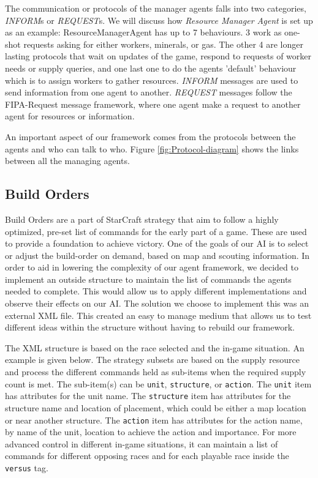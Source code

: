 \documentclass[letterpaper]{article}
\begin{document}
The communication or protocols of the manager agents falls into two categories, \emph{INFORM}s or \emph{REQUEST}s. 
We will discuss how \emph{Resource Manager Agent} is set up as an example:
ResourceManagerAgent has up to 7 behaviours. 3 work as one-shot requests asking for either workers, minerals, or 
gas. The other 4 are longer lasting protocols that wait on updates of the game, respond to requests of worker needs 
or supply queries, and one last one to do the agents 'default' behaviour which is to assign workers to gather 
resources. \emph{INFORM} messages are used to send information from one agent to another. \emph{REQUEST} messages
follow the FIPA-Request message framework, where one agent make a request to another agent for resources or information.

An important aspect of our framework comes from the protocols between the agents and who can talk to who.  Figure 
\ref{fig:Protocol-diagram} shows the links between all the managing agents.


\subsection{Build Orders}
Build Orders are a part of StarCraft strategy that aim to follow a highly optimized, pre-set list of commands for the early part of a game.  These are used to provide a foundation to achieve victory.  One of the goals of our AI is to select or adjust the build-order on demand, based on map and scouting information.  In order to aid in lowering the complexity of our agent framework, we decided to implement an outside structure to maintain the list of commands the agents needed to complete.  This would allow us to apply different implementations and observe their effects on our AI.  The solution we choose to implement this was an external XML file.  This created an easy to manage medium that allows us to test different ideas within the structure without having to rebuild our framework.

The XML structure is based on the race selected and the in-game situation. An example is given below. The strategy subsets are based on the supply resource and process the different commands held as sub-items when the required supply count is met.  The sub-item(s) can be {\tt unit}, {\tt structure}, or {\tt action}.  The {\tt unit} item has attributes for the unit name.  The {\tt structure} item has attributes for the structure name and location of placement, which could be either a map location or near another structure.  The {\tt action} item has attributes for the action name, by name of the unit, location to achieve the action and importance.  For more advanced control in different in-game situations, it can maintain a list of commands for different opposing races and for each playable race inside the {\tt versus} tag.
\end{document}
